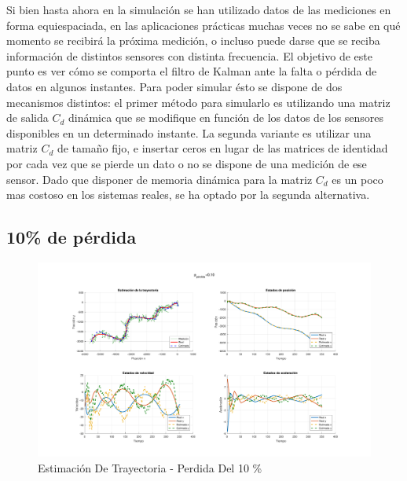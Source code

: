 
	Si bien hasta ahora en la simulación se han utilizado datos de las mediciones en forma equiespaciada, en las aplicaciones prácticas muchas veces no se sabe en qué momento se recibirá la próxima medición, o incluso puede darse que se reciba información de distintos sensores con distinta frecuencia. El objetivo de este punto es ver cómo se comporta el filtro de Kalman ante la falta o pérdida de datos en algunos instantes. Para poder simular ésto se dispone de dos mecanismos distintos: el primer método para simularlo es utilizando una matriz de salida $C_d$ dinámica que se modifique en función de los datos de los sensores disponibles en un determinado instante. La segunda variante es utilizar una matriz $C_d$ de tamaño fijo, e insertar ceros en lugar de las matrices de identidad por cada vez que se pierde un dato o no se dispone de una medición de ese sensor. Dado que disponer de memoria dinámica para la matriz $C_d$ es un poco mas costoso en los sistemas reales, se ha optado por la segunda alternativa.
	
	\subsection{10\% de pérdida}
	
	\begin{figure}[H]
		\centering
		\includegraphics[scale=0.5,trim={6,5cm 0 0 0}]{Figuras/graf_ej7_1.pdf}
		\caption{Estimación De Trayectoria - Perdida Del 10 \%}
		\label{fig:ej7_1}
	\end{figure}
	

